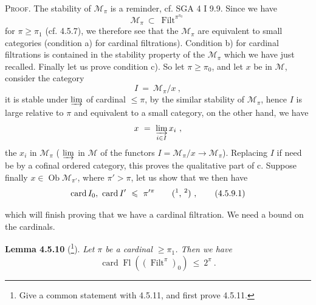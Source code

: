 \documentclass[11pt]{article}
\newcommand{\msp}[1]{\marginpar{\footnotesize [#1]}}
\newcommand{\Filt}{\operatorname{Filt}}
\newcommand{\Ob}{\operatorname{Ob}}
\newcommand{\card}{\operatorname{card}}
\newcommand{\Fl}{\operatorname{Fl}}
\begin{document}
\textsc{Proof.} The stability of $\mathcal{M}_\pi$ is a reminder, cf. SGA 4 I 9.9. Since we have
\[
\mathcal{M}_\pi \ \subset \ \Filt^{\pi^{\pi_0}}
\]
for $\pi \geqslant \pi_1$ (cf. 4.5.7), we therefore see that the $\mathcal{M}_\pi$ are equivalent to small categories (condition a) for cardinal filtrations). Condition b) for cardinal filtrations is contained in the stability property of the $\mathcal{M}_\pi$ which we have just recalled. Finally let us prove condition c). So let $\pi \geqslant \pi_0$, and let $x$ be in $\mathcal{M}$, consider the category
\[
I \ = \ \mathcal{M}_\pi/x \ ,
\]
it is stable under $\varinjlim$ of cardinal $\leqslant \pi$, by the similar stability of $\mathcal{M}_\pi$, hence $I$ is large relative to $\pi$ and equivalent to a small category, on the other hand, we have
\msp{page 122}
\[
x \ = \ \varinjlim_{i \in I} x_i \ ,
\]
the $x_i$ in $\mathcal{M}_\pi$ ( $\varinjlim$ in $\mathcal{M}$ of the functors $I = \mathcal{M}_\pi/x \longrightarrow \mathcal{M}_\pi$). Replacing $I$ if need be by a cofinal ordered category, this proves the qualitative part of c. Suppose finally $x \in \Ob \mathcal{M}_{\pi'}$, where $\pi' > \pi$, let us show that we then have
\[
\card I_0, \ \card I' \ \leqslant \ \pi'^{\pi} \qquad \text{(\footnotemark, \footnotemark)} \ , \tag*{(4.5.9.1)}
\]
\addtocounter{footnote}{-1}%
%
%
%
which will finish proving that we have a cardinal filtration. We need a bound on the cardinals.

\textbf{Lemma 4.5.10} (\footnote{Give a common statement with 4.5.11, and first prove 4.5.11.}). \textit{Let $\pi$ be a cardinal $\geqslant \pi_1$. Then we have} %
\[
\card \Fl((\Filt^\pi)_0) \ \leqslant \ 2^\pi \ . \tag*{(4.5.10.1)}
\]
\end{document}
